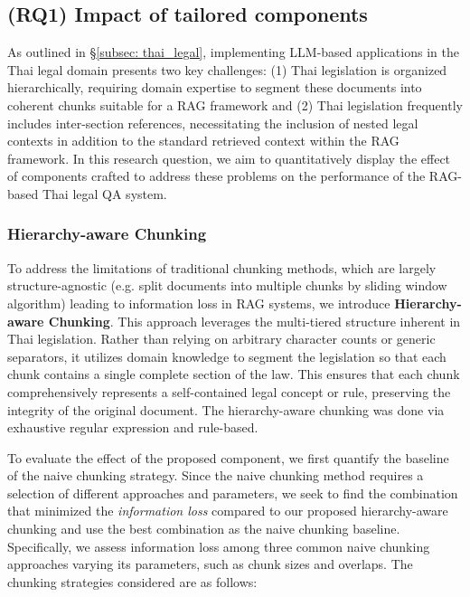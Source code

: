 \subsection{(RQ1) Impact of tailored components}
\label{subsec: setup_rq1}
As outlined in \S\ref{subsec: thai_legal}, implementing LLM-based applications in the Thai legal domain presents two key challenges: 
%
(1) Thai legislation is organized hierarchically, requiring domain expertise to segment these documents into coherent chunks suitable for a RAG framework and 
%
(2) Thai legislation frequently includes inter-section references, necessitating the inclusion of nested legal contexts in addition to the standard retrieved context within the RAG framework. 
%
In this research question, we aim to quantitatively display the effect of components crafted to address these problems on the performance of the RAG-based Thai legal QA system.

\subsubsection{Hierarchy-aware Chunking}
\label{subsubsec: chunk_setup}

To address the limitations of traditional chunking methods, which are largely structure-agnostic (e.g. split documents into multiple chunks by sliding window algorithm) leading to information loss in RAG systems, we introduce \textbf{Hierarchy-aware Chunking}. 
%
This approach leverages the multi-tiered structure inherent in Thai legislation. 
%
Rather than relying on arbitrary character counts or generic separators, it utilizes domain knowledge to segment the legislation so that each chunk contains a single complete section of the law. 
%
This ensures that each chunk comprehensively represents a self-contained legal concept or rule, preserving the integrity of the original document.
%
The hierarchy-aware chunking was done via exhaustive regular expression and rule-based.

To evaluate the effect of the proposed component, we first quantify the baseline of the naive chunking strategy.
%
Since the naive chunking method requires a selection of different approaches and parameters, we seek to find the combination that minimized the \textit{information loss} compared to our proposed hierarchy-aware chunking and use the best combination as the naive chunking baseline.
%
Specifically, we assess information loss among three common naive chunking approaches varying its parameters, such as chunk sizes and overlaps. 
%
%
The chunking strategies considered are as follows:

